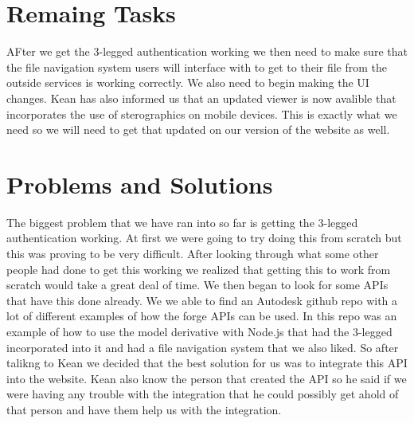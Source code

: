 \documentclass[10pt,draftclsnofoot,onecolumn]{IEEEtran}
\begin{document}


\section{Remaing Tasks}
AFter we get the 3-legged authentication working we then need to make sure that the file navigation system users will interface with to get to their file from the outside services is working correctly. We also need to begin making the UI changes. Kean has also informed us that an updated viewer is now avalible that incorporates the use of sterographics on mobile devices. This is exactly what we need so we will need to get that updated on our version of the website as well. 

\section{Problems and Solutions}
The biggest problem that we have ran into so far is getting the 3-legged authentication working. At first we were going to try doing this from scratch but this was proving to be very difficult. After looking through what some other people had done to get this working we realized that getting this to work from scratch would take a great deal of time. We then began to look for some APIs that have this done already. We we able to find an Autodesk github repo with a lot of different examples of how the forge APIs can be used. In this repo was an example of how to use the model derivative with Node.js that had the 3-legged incorporated into it and had a file navigation system that we also liked. So after talikng to Kean we decided that the best solution for us was to integrate this API into the website. Kean also know the person that created the API so he said if we were having any trouble with the integration that he could possibly get ahold of that person and have them help us with the integration.


\end{document}
